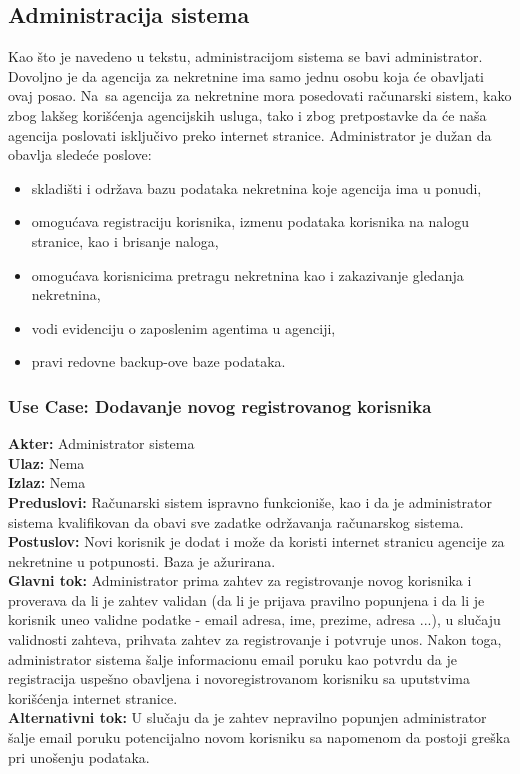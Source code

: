 \documentclass{article}
\begin{document}
\subsection{\bfseries Administracija sistema}
\indent Kao \v {s}to je navedeno u tekstu, administracijom sistema se bavi administrator. Dovoljno je da agencija za nekretnine ima samo jednu osobu koja \' ce obavljati ovaj posao. Na\ {s}a agencija za nekretnine mora posedovati ra\v {c}unarski sistem, kako zbog lak\v {s}eg kori\v {s}\' cenja agencijskih usluga, tako i zbog pretpostavke da \'ce na\v {s}a agencija poslovati isklju\v {c}ivo preko internet stranice. Administrator je du\v {z}an da obavlja slede\' ce poslove:
\begin{itemize}
    \item skladi\v {s}ti i odr\v {z}ava bazu podataka nekretnina koje agencija ima u ponudi,\\
    \item omogu\' cava registraciju korisnika, izmenu podataka korisnika na nalogu stranice, kao i brisanje naloga,\\
    \item omogu\' cava korisnicima pretragu nekretnina kao i zakazivanje gledanja nekretnina,\\
    \item vodi evidenciju o zaposlenim agentima u agenciji,\\
    \item pravi redovne backup-ove baze podataka.\\
\end{itemize}
\subsubsection{\bfseries Use Case: Dodavanje novog registrovanog korisnika}
{\bfseries Akter:} Administrator sistema\\
{\bfseries Ulaz:} Nema\\
{\bfseries Izlaz:} Nema\\
{\bfseries Preduslovi:} Ra\v {c}unarski sistem ispravno funkcioni\v {s}e, kao i da je administrator sistema kvalifikovan da obavi sve zadatke odr\v {z}avanja ra\v {c}unarskog sistema.\\
{\bfseries Postuslov:} Novi korisnik je dodat i mo\v {z}e da koristi internet stranicu agencije za nekretnine u potpunosti. Baza je a\v {z}urirana.\\
{\bfseries Glavni tok:} Administrator prima zahtev za registrovanje novog korisnika i proverava da li je zahtev validan (da li je prijava pravilno popunjena i da li je korisnik uneo validne podatke - email adresa, ime, prezime, adresa ...), u slu\v {c}aju validnosti zahteva, prihvata zahtev za registrovanje i potvr\dj uje unos. Nakon toga, administrator sistema \v {s}alje informacionu email poruku kao potvrdu da je registracija uspe\v {s}no obavljena i novoregistrovanom korisniku sa uputstvima kori\v {s}\' cenja internet stranice.\\
{\bfseries Alternativni tok:} U slu\v {c}aju da je zahtev nepravilno popunjen administrator \v {s}alje email poruku potencijalno novom korisniku sa napomenom da postoji gre\v {s}ka pri uno\v {s}enju podataka.\\
\end{document}
